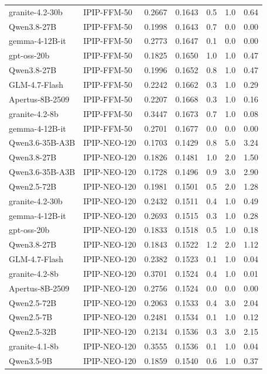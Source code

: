 \begin{tabular}{llrrrrr}
granite-4.2-30b & IPIP-FFM-50 & 0.2667 & 0.1643 & 0.5 & 1.0 & 0.64\\
Qwen3.8-27B & IPIP-FFM-50 & 0.1998 & 0.1643 & 0.7 & 0.0 & 0.00\\
gemma-4-12B-it & IPIP-FFM-50 & 0.2773 & 0.1647 & 0.1 & 0.0 & 0.00\\
gpt-oss-20b & IPIP-FFM-50 & 0.1825 & 0.1650 & 1.0 & 1.0 & 0.47\\
Qwen3.8-27B & IPIP-FFM-50 & 0.1996 & 0.1652 & 0.8 & 1.0 & 0.47\\
GLM-4.7-Flash & IPIP-FFM-50 & 0.2242 & 0.1662 & 0.3 & 1.0 & 0.29\\
Apertus-8B-2509 & IPIP-FFM-50 & 0.2207 & 0.1668 & 0.3 & 1.0 & 0.16\\
granite-4.2-8b & IPIP-FFM-50 & 0.3447 & 0.1673 & 0.7 & 1.0 & 0.08\\
gemma-4-12B-it & IPIP-FFM-50 & 0.2701 & 0.1677 & 0.0 & 0.0 & 0.00\\
Qwen3.6-35B-A3B & IPIP-NEO-120 & 0.1703 & 0.1429 & 0.8 & 5.0 & 3.24\\
Qwen3.8-27B & IPIP-NEO-120 & 0.1826 & 0.1481 & 1.0 & 2.0 & 1.50\\
Qwen3.6-35B-A3B & IPIP-NEO-120 & 0.1728 & 0.1496 & 0.9 & 3.0 & 2.90\\
Qwen2.5-72B & IPIP-NEO-120 & 0.1981 & 0.1501 & 0.5 & 2.0 & 1.28\\
granite-4.2-30b & IPIP-NEO-120 & 0.2432 & 0.1511 & 0.4 & 1.0 & 0.49\\
gemma-4-12B-it & IPIP-NEO-120 & 0.2693 & 0.1515 & 0.3 & 1.0 & 0.28\\
gpt-oss-20b & IPIP-NEO-120 & 0.1833 & 0.1518 & 0.5 & 1.0 & 0.18\\
Qwen3.8-27B & IPIP-NEO-120 & 0.1843 & 0.1522 & 1.2 & 2.0 & 1.12\\
GLM-4.7-Flash & IPIP-NEO-120 & 0.2382 & 0.1523 & 0.1 & 1.0 & 0.04\\
granite-4.2-8b & IPIP-NEO-120 & 0.3701 & 0.1524 & 0.4 & 1.0 & 0.01\\
Apertus-8B-2509 & IPIP-NEO-120 & 0.2756 & 0.1524 & 0.0 & 0.0 & 0.00\\
Qwen2.5-72B & IPIP-NEO-120 & 0.2063 & 0.1533 & 0.4 & 3.0 & 2.04\\
Qwen2.5-7B & IPIP-NEO-120 & 0.2481 & 0.1534 & 0.1 & 1.0 & 0.12\\
Qwen2.5-32B & IPIP-NEO-120 & 0.2134 & 0.1536 & 0.3 & 3.0 & 2.15\\
granite-4.1-8b & IPIP-NEO-120 & 0.3555 & 0.1536 & 0.1 & 1.0 & 0.04\\
Qwen3.5-9B & IPIP-NEO-120 & 0.1859 & 0.1540 & 0.6 & 1.0 & 0.37\\

\end{tabular}
